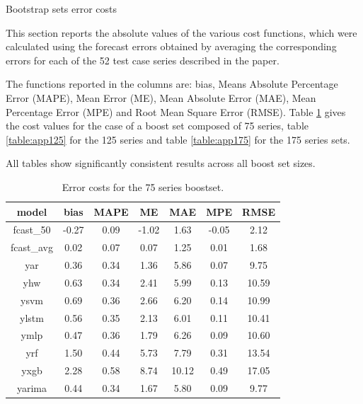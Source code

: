 \documentclass[opre,sglanonrev,11pt]{informs4}
\begin{document}
\begin{APPENDIX}{Bootstrap sets error costs} \label{app:errcost}

This section reports the absolute values of the various cost functions, which were calculated using the forecast errors obtained by averaging the corresponding errors for each of the 52 test case series described in the paper.

The functions reported in the columns are: bias, Means Absolute Percentage Error (MAPE), Mean Error (ME), Mean Absolute Error (MAE), Mean Percentage Error (MPE) and Root Mean Square Error (RMSE). Table \ref{table:app75} gives the cost values for the case of a boost set composed of 75 series, table \ref{table:app125} for the 125 series and table \ref{table:app175} for the 175 series sets.

All tables show significantly consistent results across all boost set sizes.

\begin{table}[h]
	\centering
	\renewcommand{\arraystretch}{0.75}
	\begin{tabular}{ccccccc}
		model & bias & MAPE & ME & MAE & MPE & RMSE \\
		\hline
		fcast\_50   &-0.27 & 0.09 &-1.02 & 1.63 &-0.05 &  2.12 \\
		fcast\_avg  & 0.02 & 0.07 & 0.07 & 1.25 & 0.01 &  1.68 \\
		yar         & 0.36 & 0.34 & 1.36 & 5.86 & 0.07 &  9.75 \\
		yhw         & 0.63 & 0.34 & 2.41 & 5.99 & 0.13 & 10.59 \\
		ysvm        & 0.69 & 0.36 & 2.66 & 6.20 & 0.14 & 10.99 \\
		ylstm       & 0.56 & 0.35 & 2.13 & 6.01 & 0.11 & 10.41 \\
		ymlp        & 0.47 & 0.36 & 1.79 & 6.26 & 0.09 & 10.60 \\
		yrf         & 1.50 & 0.44 & 5.73 & 7.79 & 0.31 & 13.54 \\
		yxgb        & 2.28 & 0.58 & 8.74 &10.12 & 0.49 & 17.05 \\
		yarima      & 0.44 & 0.34 & 1.67 & 5.80 & 0.09 &  9.77 \\
		\hline
	\end{tabular}
	\caption{Error costs for the 75 series boostset.}
	\label{table:app75}
\end{table}


\end{APPENDIX}
\end{document}
